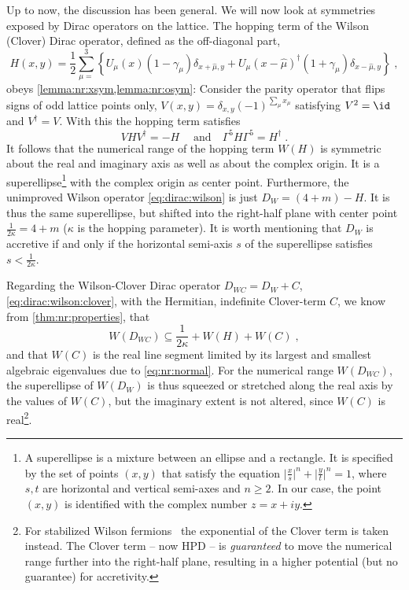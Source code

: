 Up to now, the discussion has been general.
We will now look at symmetries exposed by Dirac operators on the lattice.
The hopping term of the Wilson (Clover) Dirac operator, defined as the off-diagonal part,
\begin{equation}
H(x,y) = \frac{1}{2} \sum_{\mu=}^{3}
\left\{
      U_{\mu}(x) (1 - \gamma_{\mu}) \delta_{x+\hat{\mu}, y}
    + U_{\mu}(x - \hat{\mu})^{\dagger} (1 + \gamma_{\mu}) \delta_{x-\hat{\mu}, y}
\right\} \;,
\end{equation}
obeys \cref{lemma:nr:xsym,lemma:nr:osym}:
Consider the parity operator that flips signs of odd lattice points only, $V(x,y) = \delta_{x,y} (-1)^{\sum_{\mu} x_{\mu}}$ satisfying $V^{2} = \id$ and $V^{\dagger} = V$.
With this the hopping term satisfies
\begin{equation}
V H V^{\dagger} = -H \;
\quad
\text{and}
\quad
\Gamma^{5} H \Gamma^{5} = H^{\dagger} \;.
\end{equation}
It follows that the numerical range of the hopping term $W(H)$ is symmetric about the real and imaginary axis as well as about the complex origin.
It is a superellipse\footnote{A superellipse is a mixture between an ellipse and a rectangle. It is specified by the set of points $(x,y)$ that satisfy the equation $\lvert \frac{x}{s} \rvert^n + \lvert \frac{y}{t} \rvert^n = 1$, where $s,t$ are horizontal and vertical semi-axes and $n \geq 2$. In our case, the point $(x,y)$ is identified with the complex number $z = x + iy$.} with the complex origin as center point.
Furthermore, the unimproved Wilson operator \cref{eq:dirac:wilson} is just $D_W = (4+m) - H$.
It is thus the same superellipse, but shifted into the right-half plane with center point $\frac{1}{2 \kappa} = 4+m$ ($\kappa$ is the hopping parameter).
It is worth mentioning that $D_W$ is accretive if and only if the horizontal semi-axis $s$ of the superellipse satisfies $s < \frac{1}{2 \kappa}$.

Regarding the Wilson-Clover Dirac operator $D_{WC} = D_W + C$, \cref{eq:dirac:wilson:clover}, with the Hermitian,  indefinite Clover-term $C$, we know from \cref{thm:nr:properties}, that
\begin{equation}
W(D_{WC}) \subseteq  \frac{1}{2 \kappa} + W(H) + W(C) \;,
\end{equation}
and that $W(C)$ is the real line segment limited by its largest and smallest algebraic eigenvalues due to \cref{eq:nr:normal}.
For the numerical range $W(D_{WC})$, the superellipse of $W(D_{W})$ is thus squeezed or stretched along the real axis by the values of $W(C)$, but the  imaginary extent is not altered, since $W(C)$ is real\footnote{For stabilized Wilson fermions~\cite{Francis:2019muy} the exponential of the Clover term is taken instead. The Clover term -- now HPD -- is \emph{guaranteed} to move the numerical range further into the right-half plane, resulting in a higher potential (but no guarantee) for accretivity.}.

